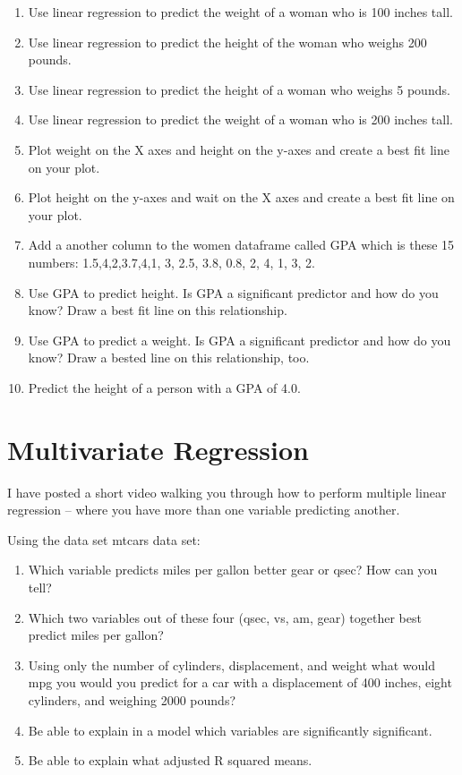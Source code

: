 \documentclass[
]{book}
\providecommand{\tightlist}{%
  \setlength{\itemsep}{0pt}\setlength{\parskip}{0pt}}
\begin{document}
\begin{enumerate}
\def\labelenumi{\arabic{enumi}.}
\tightlist
\item
  Use linear regression to predict the weight of a woman who is 100 inches tall.
\item
  Use linear regression to predict the height of the woman who weighs 200 pounds.
\item
  Use linear regression to predict the height of a woman who weighs 5 pounds.
\item
  Use linear regression to predict the weight of a woman who is 200 inches tall.
\item
  Plot weight on the X axes and height on the y-axes and create a best fit line on your plot.
\item
  Plot height on the y-axes and wait on the X axes and create a best fit line on your plot.
\item
  Add a another column to the women dataframe called GPA which is these 15 numbers: 1.5,4,2,3.7,4,1, 3, 2.5, 3.8, 0.8, 2, 4, 1, 3, 2.
\item
  Use GPA to predict height. Is GPA a significant predictor and how do you know? Draw a best fit line on this relationship.
\item
  Use GPA to predict a weight. Is GPA a significant predictor and how do you know? Draw a bested line on this relationship, too.
\item
  Predict the height of a person with a GPA of 4.0.
\end{enumerate}

\hypertarget{multivariate-regression}{%
\section{Multivariate Regression}\label{multivariate-regression}}

I have posted a short video walking you through how to perform multiple linear regression -- where you have more than one variable predicting another.

Using the data set mtcars data set:

\begin{enumerate}
\def\labelenumi{\arabic{enumi}.}
\tightlist
\item
  Which variable predicts miles per gallon better gear or qsec? How can you tell?
\item
  Which two variables out of these four (qsec, vs, am, gear) together best predict miles per gallon?
\item
  Using only the number of cylinders, displacement, and weight what would mpg you would you predict for a car with a displacement of 400 inches, eight cylinders, and weighing 2000 pounds?
\item
  Be able to explain in a model which variables are significantly significant.
\item
  Be able to explain what adjusted R squared means.
\end{enumerate}
\end{document}
